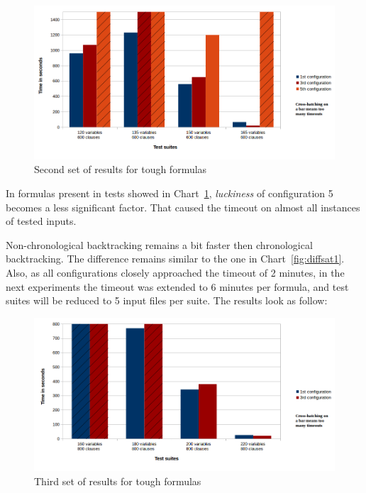 \documentclass[12pt,english,pdflatex]{aghdpl}
\begin{document}
\begin{figure}[H]
\begin{centering}
\includegraphics[scale=0.62]{charts/diff_sat_2}
\par\end{centering}
\caption{Second set of results for tough formulas}
\label{fig:diffsat2}
\end{figure}

In formulas present in tests showed in Chart~\ref{fig:diffsat2}, \textit{luckiness} of configuration 5 becomes a less significant factor. That caused the timeout on almost all instances of tested inputs. 

Non-chronological backtracking remains a bit faster then chronological backtracking. The difference remains similar to the one in Chart~\ref{fig:diffsat1}. Also, as all configurations  closely approached the timeout of 2 minutes, in the next experiments the timeout was  extended to 6 minutes per formula, and test suites will be reduced to 5 input files per suite. The results look as follow:

\begin{figure}[H]
\begin{centering}
\includegraphics[scale=0.62]{charts/diff_sat_3}
\par\end{centering}
\caption{Third set of results for tough formulas}
\label{fig:diffsat3}
\end{figure}
\end{document}
